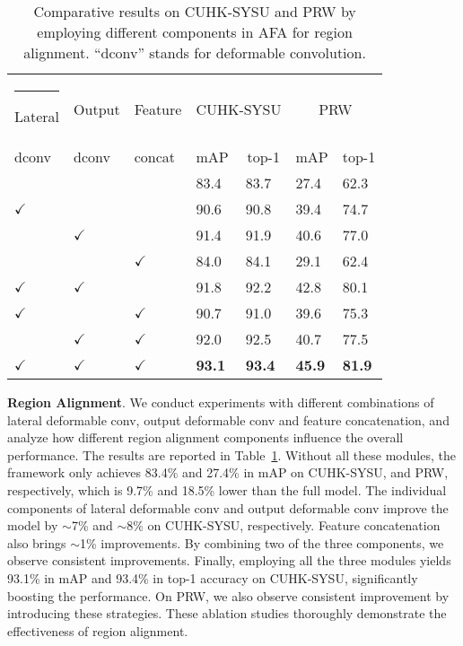 \documentclass[journal]{IEEEtran}
\makeatletter
\newcommand{\thickhline}{\noalign {\ifnum 0=`}\fi \hrule height 1pt
    \futurelet \reserved@a \@xhline
}
\makeatother
\begin{document}
\begin{table}[t]
\small
\centering
\begin{tabular}{p{0.8cm}<{\centering}p{0.8cm}<{\centering}p{0.8cm}<{\centering}|p{0.8cm}<{\centering}p{0.8cm}<{\centering}|p{0.8cm}<{\centering}p{0.8cm}<{\centering}}
\hline\thickhline
\rowcolor{mygray}  
Lateral              & Output               & Feature              & \multicolumn{2}{c}{CUHK-SYSU}     & \multicolumn{2}{|c}{PRW}                   \\ \cline{4-7} 
\rowcolor{mygray}  
dconv                 & dconv                 & concat               & mAP                  & \multicolumn{1}{c}{top-1} & \multicolumn{1}{|c}{mAP}                  & \multicolumn{1}{c}{top-1} \\ 
\hline \hline  
 &   & & 83.4 & 83.7              & 27.4       & 62.3            \\ 
$\checkmark$ &   & & 90.6 & 90.8        &39.4   &   74.7             \\
 & $\checkmark$  & & 91.4 & 91.9          & 40.6   &    77.0              \\
  &   & $\checkmark$ & 84.0 & 84.1         & 29.1  &     62.4              \\
$\checkmark$ & $\checkmark$  & & 91.8 & 92.2     & 42.8  &   80.1                    \\
$\checkmark$ &   & $\checkmark$ & 90.7 & 91.0     & 39.6  &   75.3                     \\
 & $\checkmark$  & $\checkmark$& 92.0 & 92.5       & 40.7  &    77.5                  \\
$\checkmark$ & $\checkmark$  & $\checkmark$ & \textbf{93.1} & \textbf{93.4}    &  \textbf{45.9} &    \textbf{81.9}                  \\\hline
\end{tabular}
\caption{Comparative results on CUHK-SYSU and PRW by employing different components in AFA for region alignment. ``dconv'' stands for deformable convolution. }
\label{tab:region}
\end{table}




\textbf{Region Alignment}. 
We conduct experiments with different combinations of lateral deformable conv, output deformable conv and feature concatenation, and analyze how different region alignment components influence the overall performance. The results are reported in Table~\ref{tab:region}. Without all these modules, the framework only achieves 83.4\% and 27.4\% in mAP on CUHK-SYSU, and PRW, respectively, which is 9.7\% and 18.5\% lower than the full model. The individual components of lateral deformable conv and output deformable conv improve the model by $\sim$7\% and $\sim$8\% on CUHK-SYSU, respectively. Feature concatenation also brings $\sim$1\% improvements. By combining two of the three components, we observe consistent improvements. Finally, employing all the three modules yields 93.1\% in mAP and 93.4\% in top-1 accuracy on CUHK-SYSU, significantly boosting the performance. On PRW, we also observe consistent improvement by introducing these strategies. These ablation studies thoroughly demonstrate the effectiveness of region alignment.
\end{document}
